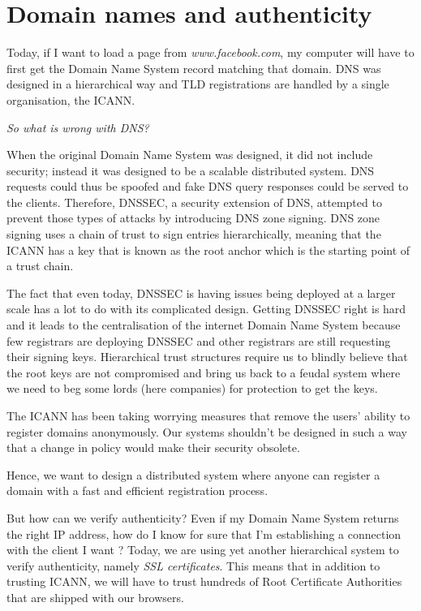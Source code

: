 \documentclass{vldb}
\begin{document}
\section{Domain names and authenticity}

Today, if I want to load a page from \emph{www.facebook.com}, my computer will have to first get the Domain Name System record matching that domain. DNS was designed in a hierarchical way and TLD registrations are handled by a single organisation, the ICANN.

\emph{So what is wrong with DNS?}

When the original Domain Name System was designed, it did not include security; instead it was designed to be a scalable distributed system. DNS requests could thus be spoofed and fake DNS query responses could be served to the clients. Therefore, DNSSEC, a security extension of DNS, attempted to prevent those types of attacks by introducing DNS zone signing. DNS zone signing uses a chain of trust to sign entries hierarchically,  meaning that the ICANN has a key that is known as the root anchor which is the starting point of a trust chain.

The fact that even today, DNSSEC is having issues being deployed at a larger scale has a lot to do with its complicated design. Getting DNSSEC right is hard and it leads to the centralisation of the internet Domain Name System because few registrars are deploying DNSSEC and other registrars are still requesting their signing keys. Hierarchical trust structures require us to blindly believe that the root keys are not compromised and bring us back to a feudal system where we need to beg some lords (here companies) for protection to get the keys.

The ICANN has been taking worrying measures that remove the users' ability to register domains anonymously\cite{icannabuse}. Our systems shouldn't be designed in such a way that a change in policy would make their security obsolete. 

Hence, we want to design a distributed system where anyone can register a domain with a fast and efficient registration process.

But how can we verify authenticity? 
Even if my Domain Name System returns the right IP address, how do I know for sure that I'm establishing a connection with the client I want ? Today, we are using yet another hierarchical system to verify authenticity, namely \emph{SSL certificates}. This means that in addition to trusting ICANN, we will have to trust hundreds of Root Certificate Authorities that are shipped with our browsers.\cite{mozillaSSL}
\end{document}
